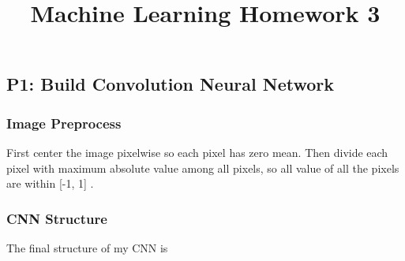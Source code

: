 \documentclass[fleqn,a4paper,12pt]{article}
\title{Machine Learning Homework 3}
\date{}
\begin{document}
\maketitle
\thispagestyle{fancy}

\subsection*{P1: Build Convolution Neural Network}

\subsubsection*{Image Preprocess}

First center the image pixelwise so each pixel has zero mean. Then divide each pixel with maximum absolute value among all pixels, so all value of all the pixels are within [-1, 1] \cite{cs221_project}.

\subsubsection*{CNN Structure}

The final structure of my CNN is
\end{document}
